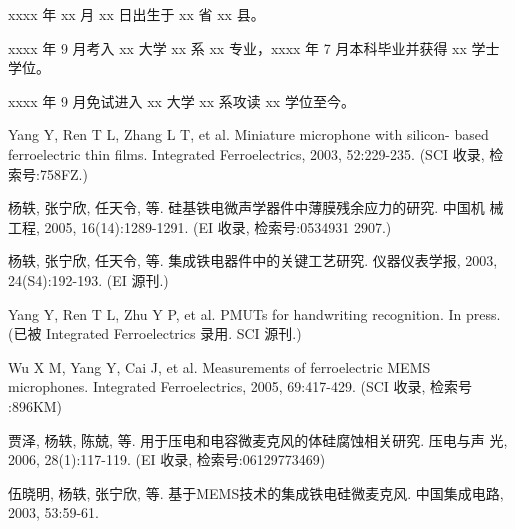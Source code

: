 \documentclass[degree=doctor]{thuthesis}
\begin{document}
\START
\showoutput

\backmatter
\setcounter{page}{116}
\begin{resume}


  xxxx 年 xx 月 xx 日出生于 xx 省 xx 县。

  xxxx 年 9 月考入 xx 大学 xx 系 xx 专业，xxxx 年 7 月本科毕业并获得 xx 学士学位。

  xxxx 年 9 月免试进入 xx 大学 xx 系攻读 xx 学位至今。


  \begin{publications}
    \item Yang Y, Ren T L, Zhang L T, et al. Miniature microphone with silicon-
      based ferroelectric thin films. Integrated Ferroelectrics, 2003,
      52:229-235. (SCI 收录, 检索号:758FZ.)
    \item 杨轶, 张宁欣, 任天令, 等. 硅基铁电微声学器件中薄膜残余应力的研究. 中国机
      械工程, 2005, 16(14):1289-1291. (EI 收录, 检索号:0534931 2907.)
    \item 杨轶, 张宁欣, 任天令, 等. 集成铁电器件中的关键工艺研究. 仪器仪表学报,
      2003, 24(S4):192-193. (EI 源刊.)
  \end{publications}

  \begin{publications}[before=\publicationskip,after=\publicationskip]
    \item Yang Y, Ren T L, Zhu Y P, et al. PMUTs for handwriting recognition. In
      press. (已被 Integrated Ferroelectrics 录用. SCI 源刊.)
  \end{publications}

  \begin{publications}
    \item Wu X M, Yang Y, Cai J, et al. Measurements of ferroelectric MEMS
      microphones. Integrated Ferroelectrics, 2005, 69:417-429. (SCI 收录, 检索号
      :896KM)
    \item 贾泽, 杨轶, 陈兢, 等. 用于压电和电容微麦克风的体硅腐蚀相关研究. 压电与声
      光, 2006, 28(1):117-119. (EI 收录, 检索号:06129773469)
    \item 伍晓明, 杨轶, 张宁欣, 等. 基于MEMS技术的集成铁电硅微麦克风. 中国集成电路,
      2003, 53:59-61.
  \end{publications}


\end{resume}
\end{document}

